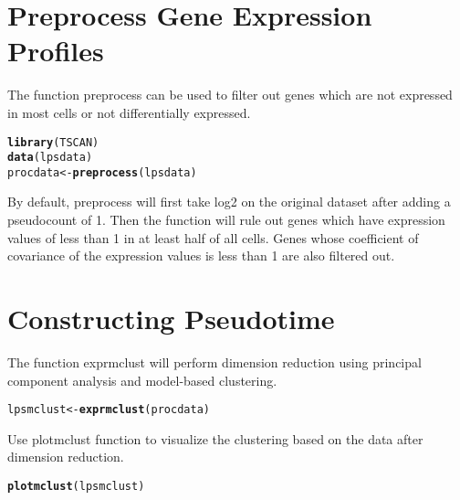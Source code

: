 \documentclass[10pt,oneside]{article}\usepackage[]{graphicx}\usepackage[]{color}
\makeatletter
\newcommand{\hlstd}[1]{\textcolor[rgb]{0.345,0.345,0.345}{#1}}%
\newcommand{\hlkwb}[1]{\textcolor[rgb]{0.69,0.353,0.396}{#1}}%
\newcommand{\hlkwd}[1]{\textcolor[rgb]{0.737,0.353,0.396}{\textbf{#1}}}%
\newenvironment{kframe}{%
 \def\at@end@of@kframe{}%
 \ifinner\ifhmode%
  \def\at@end@of@kframe{\end{minipage}}%
  \begin{minipage}{\columnwidth}%
 \fi\fi%
 \def\FrameCommand##1{\hskip\@totalleftmargin \hskip-\fboxsep
 \colorbox{shadecolor}{##1}\hskip-\fboxsep
     \hskip-\linewidth \hskip-\@totalleftmargin \hskip\columnwidth}%
 \MakeFramed {\advance\hsize-\width
   \@totalleftmargin\z@ \linewidth\hsize
   \@setminipage}}%
 {\par\unskip\endMakeFramed%
 \at@end@of@kframe}
\newenvironment{knitrout}{}{} %
\makeatother
\begin{document}
\section{Preprocess Gene Expression Profiles}

The function preprocess can be used to filter out genes which are not expressed in most cells or not differentially expressed. 

\begin{knitrout}
\color{fgcolor}\begin{kframe}
\begin{alltt}
\hlkwd{library}\hlstd{(TSCAN)}
\hlkwd{data}\hlstd{(lpsdata)}
\hlstd{procdata} \hlkwb{<-} \hlkwd{preprocess}\hlstd{(lpsdata)}
\end{alltt}
\end{kframe}
\end{knitrout}

By default, preprocess will first take log2 on the original dataset after adding a pseudocount of 1. Then the function will rule out genes which have expression values of less than 1 in at least half of all cells. Genes whose coefficient of covariance of the expression values is less than 1 are also filtered out.

\section{Constructing Pseudotime}

The function exprmclust will perform dimension reduction using principal component analysis and model-based clustering. 

\begin{knitrout}
\color{fgcolor}\begin{kframe}
\begin{alltt}
\hlstd{lpsmclust} \hlkwb{<-} \hlkwd{exprmclust}\hlstd{(procdata)}
\end{alltt}


{\ttfamily\noindent\bfseries{}}\end{kframe}
\end{knitrout}

Use plotmclust function to visualize the clustering based on the data after dimension reduction.

\begin{knitrout}
\color{fgcolor}\begin{kframe}
\begin{alltt}
\hlkwd{plotmclust}\hlstd{(lpsmclust)}
\end{alltt}


{\ttfamily\noindent\bfseries{}}\end{kframe}
\end{knitrout}
\end{document}
